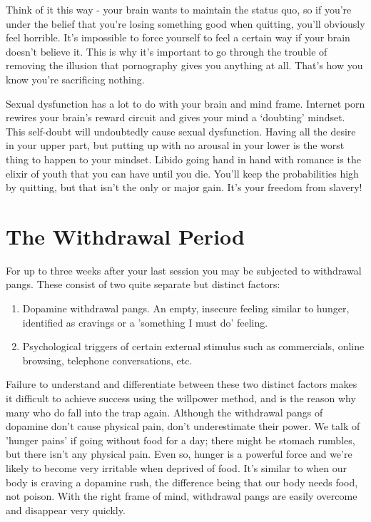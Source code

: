 \documentclass[
]{book}
\begin{document}
Think of it this way - your brain wants to maintain the status quo, so if you're under the belief that you're losing something good when quitting, you'll obviously feel horrible. It's impossible to force yourself to feel a certain way if your brain doesn't believe it. This is why it's important to go through the trouble of removing the illusion that pornography gives you anything at all. That's how you know you're sacrificing nothing.

Sexual dysfunction has a lot to do with your brain and mind frame. Internet porn rewires your brain's reward circuit and gives your mind a `doubting' mindset. This self-doubt will undoubtedly cause sexual dysfunction. Having all the desire in your upper part, but putting up with no arousal in your lower is the worst thing to happen to your mindset. Libido going hand in hand with romance is the elixir of youth that you can have until you die. You'll keep the probabilities high by quitting, but that isn't the only or major gain. It's your freedom from slavery!

\hypertarget{the-withdrawal-period}{%
\chapter{The Withdrawal Period}\label{the-withdrawal-period}}

For up to three weeks after your last session you may be subjected to withdrawal pangs. These consist of two quite separate but distinct factors:

\begin{enumerate}
\def\labelenumi{\arabic{enumi}.}
\item
  Dopamine withdrawal pangs. An empty, insecure feeling similar to hunger, identified as cravings or a 'something I must do' feeling.
\item
  Psychological triggers of certain external stimulus such as commercials, online browsing, telephone conversations, etc.
\end{enumerate}

Failure to understand and differentiate between these two distinct factors makes it difficult to achieve success using the willpower method, and is the reason why many who do fall into the trap again. Although the withdrawal pangs of dopamine don't cause physical pain, don't underestimate their power. We talk of 'hunger pains' if going without food for a day; there might be stomach rumbles, but there isn't any physical pain. Even so, hunger is a powerful force and we're likely to become very irritable when deprived of food. It's similar to when our body is craving a dopamine rush, the difference being that our body needs food, not poison. With the right frame of mind, withdrawal pangs are easily overcome and disappear very quickly.
\end{document}
